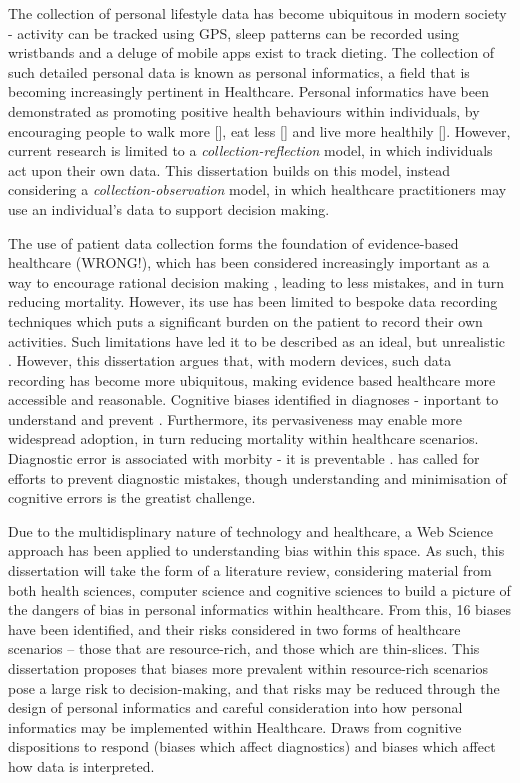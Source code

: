 
  The collection of personal lifestyle data has become ubiquitous in modern society - activity can be tracked using GPS, sleep patterns can be recorded using wristbands and a deluge of mobile apps exist to track dieting. The collection of such detailed personal data is known as personal informatics, a field that is becoming increasingly pertinent in Healthcare. Personal informatics have been demonstrated as promoting positive health behaviours within individuals, by encouraging people to walk more [], eat less [] and live more healthily []. However, current research is limited to a \textit{collection-reflection} model, in which individuals act upon their own data. This dissertation builds on this model, instead considering a \textit{collection-observation} model, in which healthcare practitioners may use an individual's data to support decision making.


  The use of patient data collection forms the foundation of evidence-based healthcare (WRONG!), which has been considered increasingly important as a way to encourage rational decision making \citep{Heneghan2013}, leading to less mistakes, and in turn reducing mortality. However, its use has been limited to bespoke data recording techniques which puts a significant burden on the patient to record their own activities. Such limitations have led it to be described as an ideal, but unrealistic \citep{Heneghan2013}. However, this dissertation argues that, with modern devices, such data recording has become more ubiquitous, making evidence based healthcare more accessible and reasonable. Cognitive biases identified in diagnoses - inportant to understand and prevent \citep{Croskerry2003}. Furthermore, its pervasiveness may enable more widespread adoption, in turn reducing mortality within healthcare scenarios. Diagnostic error is associated with morbity - it is preventable \citep{Graber2002}.  has called for efforts to prevent diagnostic mistakes, though understanding and minimisation of cognitive errors is the greatist challenge.


  Due to the multidisplinary nature of technology and healthcare, a Web Science approach has been applied to understanding bias within this space. As such, this dissertation will take the form of a literature review, considering material from both health sciences, computer science and cognitive sciences to build a picture of the dangers of bias in personal informatics within healthcare. From this, 16 biases have been identified, and their risks considered in two forms of healthcare scenarios -- those that are resource-rich, and those which are thin-slices. This dissertation proposes that biases more prevalent within resource-rich scenarios pose a large risk to decision-making, and that risks may be reduced through the design of personal informatics and careful consideration into how personal informatics may be implemented within Healthcare. Draws from cognitive dispositions to respond (biases which affect diagnostics) and biases which affect how data is interpreted.


